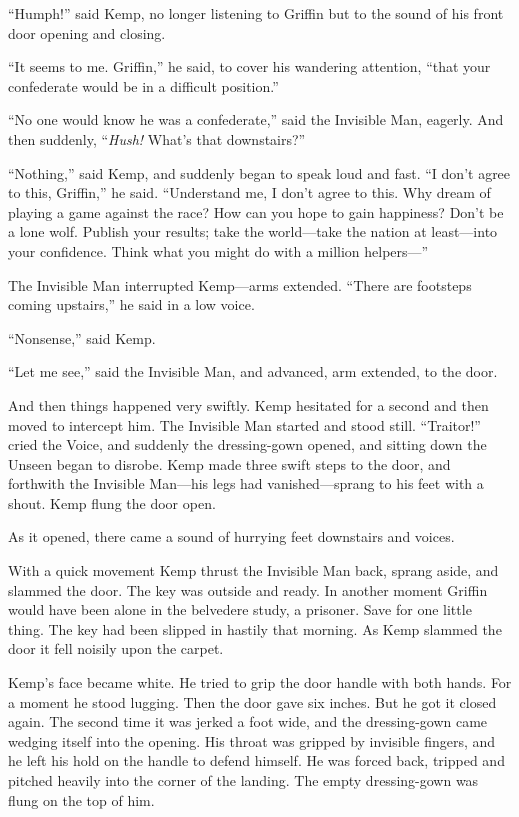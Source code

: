 “Humph!” said Kemp, no longer listening to Griffin but to the sound of his front door opening and closing.

“It seems to me. Griffin,” he said, to cover his wandering attention, “that your confederate would be in a difficult position.”

“No one would know he was a confederate,” said the Invisible Man, eagerly. And then suddenly, “\emph{Hush!} What’s that downstairs?”

“Nothing,” said Kemp, and suddenly began to speak loud and fast. “I don’t agree to this, Griffin,” he said. “Understand me, I don’t agree to this. Why dream of playing a game against the race? How can you hope to gain happiness? Don’t be a lone wolf. Publish your results; take the world—take the nation at least—into your confidence. Think what you might do with a million helpers—”

The Invisible Man interrupted Kemp—arms extended. “There are footsteps coming upstairs,” he said in a low voice.

“Nonsense,” said Kemp.

“Let me see,” said the Invisible Man, and advanced, arm extended, to the door.

And then things happened very swiftly. Kemp hesitated for a second and then moved to intercept him. The Invisible Man started and stood still. “Traitor!” cried the Voice, and suddenly the dressing-gown opened, and sitting down the Unseen began to disrobe. Kemp made three swift steps to the door, and forthwith the Invisible Man—his legs had vanished—sprang to his feet with a shout. Kemp flung the door open.

As it opened, there came a sound of hurrying feet downstairs and voices.

With a quick movement Kemp thrust the Invisible Man back, sprang aside, and slammed the door. The key was outside and ready. In another moment Griffin would have been alone in the belvedere study, a prisoner. Save for one little thing. The key had been slipped in hastily that morning. As Kemp slammed the door it fell noisily upon the carpet.

Kemp’s face became white. He tried to grip the door handle with both hands. For a moment he stood lugging. Then the door gave six inches. But he got it closed again. The second time it was jerked a foot wide, and the dressing-gown came wedging itself into the opening. His throat was gripped by invisible fingers, and he left his hold on the handle to defend himself. He was forced back, tripped and pitched heavily into the corner of the landing. The empty dressing-gown was flung on the top of him.

